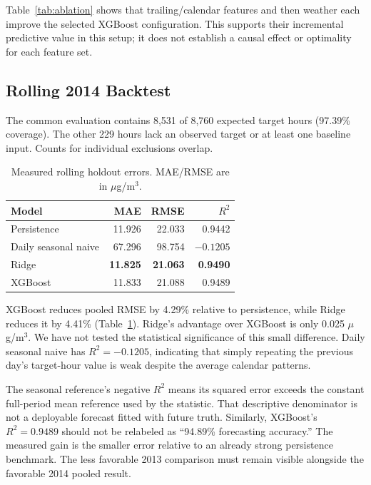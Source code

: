 \documentclass[conference]{IEEEtran}
\newcommand{\resultroot}{../../artifacts/phase1}
\begin{document}
Table~\ref{tab:ablation} shows that trailing/calendar features and then weather each improve the selected XGBoost configuration. This supports their incremental predictive value in this setup; it does not establish a causal effect or optimality for each feature set.
\begin{table}[ht]
\centering
\caption{Feature comparison on 2013 validation dates only.}
\label{tab:ablation}
\resizebox{\columnwidth}{!}{}
\end{table}

\subsection{Rolling 2014 Backtest}
The common evaluation contains 8,531 of 8,760 expected target hours (97.39\% coverage). The other 229 hours lack an observed target or at least one baseline input. Counts for individual exclusions overlap.

\begin{table}[ht]
\centering
\caption{Measured rolling holdout errors. MAE/RMSE are in $\mu$g/m$^3$.}
\label{tab:overall}
\begin{tabular}{lrrr}
\toprule
Model & MAE & RMSE & $R^2$\\\midrule
Persistence & 11.926 & 22.033 & 0.9442\\
Daily seasonal naive & 67.296 & 98.754 & $-0.1205$\\
Ridge & \textbf{11.825} & \textbf{21.063} & \textbf{0.9490}\\
XGBoost & 11.833 & 21.088 & 0.9489\\\bottomrule
\end{tabular}
\end{table}

XGBoost reduces pooled RMSE by 4.29\% relative to persistence, while Ridge reduces it by 4.41\% (Table~\ref{tab:overall}). Ridge's advantage over XGBoost is only 0.025 $\mu$g/m$^3$. We have not tested the statistical significance of this small difference. Daily seasonal naive has $R^2=-0.1205$, indicating that simply repeating the previous day's target-hour value is weak despite the average calendar patterns.

The seasonal reference's negative $R^2$ means its squared error exceeds the constant full-period mean reference used by the statistic. That descriptive denominator is not a deployable forecast fitted with future truth. Similarly, XGBoost's $R^2=0.9489$ should not be relabeled as ``94.89\% forecasting accuracy.'' The measured gain is the smaller error relative to an already strong persistence benchmark. The less favorable 2013 comparison must remain visible alongside the favorable 2014 pooled result.
\end{document}
